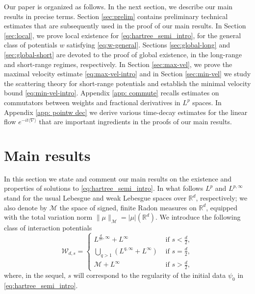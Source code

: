 \documentclass[12pt]{article}
\theoremstyle{plain}
\newcommand{\meas}{\mathcal{M}}
\newcommand{\setW}{{\mathcal{W}_{d,s}}}
\begin{document}
Our paper is organized as follows. In the next section, we describe our main results in precise terms. Section \ref{sec:prelim} contains preliminary technical estimates that are subsequently used in the proof of our main results. In Section \ref{sec:local}, we prove local existence for \eqref{eq:hartree_semi_intro}, for the general class of potentials $w$ satisfying \eqref{eq:w-general}.
Sections \ref{sec:global-long} and \ref{sec:global-short} are devoted to the proof of global existence, in the long-range and short-range regimes, respectively. In Section \ref{sec:max-vel}, we prove the maximal velocity estimate \eqref{eq:max-vel-intro} and in Section \ref{sec:min-vel} we study the scattering theory for short-range potentials and establish the minimal velocity bound \eqref{eq:min-vel-intro}. Appendix \ref{app: commute} recalls estimates on commutators between weights and fractional derivatives in $L^p$ spaces. In Appendix \ref{app: pointw dec} we derive various time-decay estimates for the linear flow $e^{-it\langle\nabla\rangle}$ that are important ingredients in the proofs of our main results.



\section{Main results}


In this section we state and comment our main results on the existence and properties of solutions to \eqref{eq:hartree_semi_intro}.   In what follows $L^p$ and $L^{p,\infty}$ stand for the usual Lebesgue and weak Lebesgue spaces over $\mathbb{R}^d$, respectively; we also denote by $\meas $ the space of signed, finite Radon measures on $\mathbb{R}^d$, equipped with the total variation norm $\|\mu\|_{\meas }=|\mu|(\mathbb{R}^d)$.
We introduce the following class of interaction potentials
\begin{equation}\label{eq:def_Wds}
\setW=\begin{cases}
    L^{\frac{d}{2s},\infty}+L^\infty &\text{ if } s<\frac{d}{2},\\
    \bigcup_{q>1}(L^{q,\infty}+L^\infty) &\text{ if } s=\frac{d}{2},\\
    \meas+L^\infty & \text{ if } s> \frac{d}{2},    
\end{cases}
\end{equation}
where, in the sequel, $s$ will correspond to the regularity of the initial data $\psi_0$ in \eqref{eq:hartree_semi_intro}.
\end{document}

